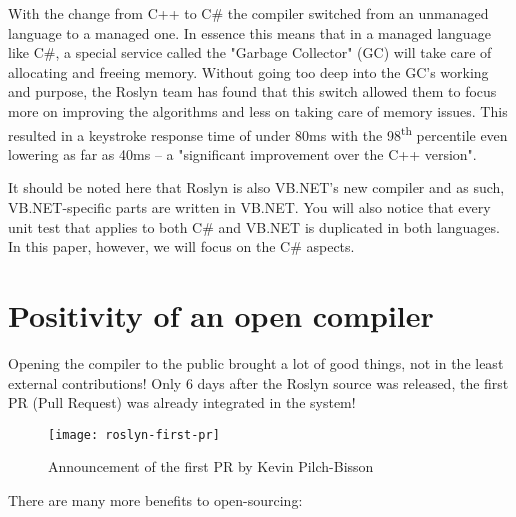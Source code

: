 With the change from C++ to C\# the compiler switched from an unmanaged language to a managed one. In essence this means that in a managed language like C\#, a special service called the "Garbage Collector" (GC) will take care of allocating and freeing memory. Without going too deep into the GC's working and purpose, the Roslyn team has found that this switch allowed them to focus more on improving the algorithms and less on taking care of memory issues. This resulted in a keystroke response time of under 80ms with the 98\textsuperscript{th} percentile even lowering as far as 40ms -- a "significant improvement over the C++ version".\parencite{Wischik2014}

It should be noted here that Roslyn is also VB.NET's new compiler and as such, VB.NET-specific parts are written in VB.NET. You will also notice that every unit test that applies to both C\# and VB.NET is duplicated in both languages. In this paper, however, we will focus on the C\# aspects.

\section{Positivity of an open compiler}
\label{sec:intro-pos-comp}

Opening the compiler to the public brought a lot of good things, not in the least external contributions! Only 6 days after the Roslyn source was released, the first PR (Pull Request) was already integrated in the system!

\begin{figure}[h]
\centering
\texttt{[image: roslyn-first-pr]}
\caption[Announcement of the first PR by Kevin Pilch-Bisson]{Announcement of the first PR by Kevin Pilch-Bisson\protect\footnotemark}
\end{figure}


There are many more benefits to open-sourcing:

